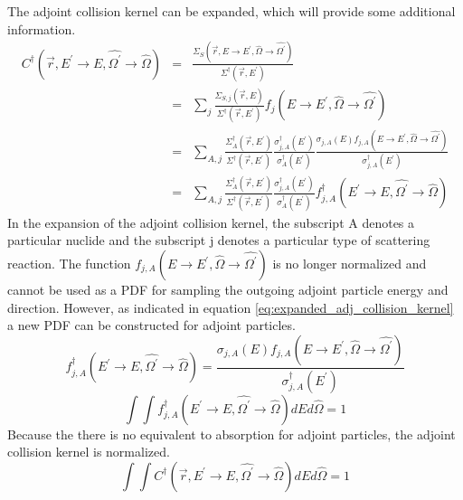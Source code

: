 The adjoint collision kernel can be expanded, which will provide some
additional information.
\begin{eqnarray}
  C^{\dagger}(\vec{r},E^{'} \to E,\hat{\Omega^{'}} \to \hat{\Omega}) & = &
  \frac{\Sigma_S(\vec{r},E \to E^{'},\hat{\Omega} \to \hat{\Omega^{'}})}
       {\Sigma^{\dagger}(\vec{r},E^{'})} \nonumber \\
       & = & \sum_j \frac{\Sigma_{S,j}(\vec{r},E)}{\Sigma^{\dagger}(\vec{r},E^{'})}
       f_j(E \to E^{'},\hat{\Omega} \to \hat{\Omega^{'}}) \nonumber \\
  & = & \sum_{A,j} \frac{\Sigma_A^{\dagger}(\vec{r},E^{'})}
                                          {\Sigma^{\dagger}(\vec{r},E^{'})}
  \frac{\sigma_{j,A}^{\dagger}(E^{'})}{\sigma_A^{\dagger}(E^{'})}
  \frac{\sigma_{j,A}(E)f_{j,A}(E \to E^{'},\hat{\Omega} \to \hat{\Omega^{'}})}
       {\sigma_{j,A}^{\dagger}(E^{'})} \nonumber \\
  & = & \sum_{A,j} \frac{\Sigma_A^{\dagger}(\vec{r},E^{'})}
                       {\Sigma^{\dagger}(\vec{r},E^{'})}
       \frac{\sigma_{j,A}^{\dagger}(E^{'})}{\sigma_A^{\dagger}(E^{'})}
       f_{j,A}^{\dagger}(E^{'} \to E,\hat{\Omega^{'}} \to \hat{\Omega})
  \label{eq:expanded_adj_collision_kernel}
\end{eqnarray}
In the expansion of the adjoint collision kernel, the subscript A denotes a 
particular nuclide and the subscript j denotes a particular type of scattering
reaction. The function $f_{j,A}(E \to E^{'},\hat{\Omega} \to \hat{\Omega^{'}})$
is no longer normalized and cannot be used as a PDF for sampling the outgoing
adjoint particle energy and direction. However, as indicated in equation
\ref{eq:expanded_adj_collision_kernel} a new PDF can be constructed for
adjoint particles.
\begin{equation}
  f_{j,A}^{\dagger}(E^{'} \to E,\hat{\Omega^{'}} \to \hat{\Omega}) = 
  \frac{\sigma_{j,A}(E)f_{j,A}(E \to E^{'},\hat{\Omega} \to \hat{\Omega^{'}})}
       {\sigma_{j,A}^{\dagger}(E^{'})}
\end{equation}
\begin{equation}
  \int\int f_{j,A}^{\dagger}(E^{'} \to E,\hat{\Omega^{'}} \to \hat{\Omega})
  dE d\hat{\Omega} = 1
\end{equation}
Because the there is no equivalent to absorption for adjoint particles, the
adjoint collision kernel is normalized.
\begin{equation}
  \int\int C^{\dagger}(\vec{r},E^{'} \to E,\hat{\Omega^{'}} \to \hat{\Omega})
  dE d\hat{\Omega} = 1
\end{equation}

